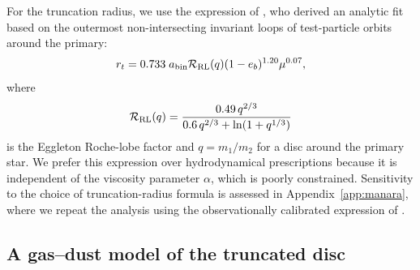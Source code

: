 \documentclass{aa}
\begin{document}
For the truncation radius, we use the expression of \citet{Pichardo2005},
who derived an analytic fit based on the outermost non-intersecting
invariant loops of test-particle orbits around the primary:
\begin{equation}
r_t = 0.733 \; a_{\rm bin} \mathcal{R}_{\rm RL}(q) (1-e_b)^{1.20}
       \mu^{0.07},
\label{eq:rt}
\end{equation}
where
\begin{equation}
\mathcal{R}_{\rm RL}(q) = \frac{0.49 \, q^{2/3}}{0.6 \, q^{2/3} +
\ln(1+q^{1/3})}
\end{equation}
is the Eggleton Roche-lobe factor \citep{Eggleton1983} and
$q = m_1/m_2$ for a disc around the primary star. We prefer this
expression over hydrodynamical prescriptions because it is independent
of the viscosity parameter $\alpha$, which is poorly constrained.
Sensitivity to the choice of truncation-radius formula is assessed in
Appendix~\ref{app:manara}, where we repeat the analysis using the
observationally calibrated expression of
\citet{Manara2019A&A...628A..95M}.

\subsection{A gas--dust model of the truncated disc}
\label{sec:model}
\end{document}
